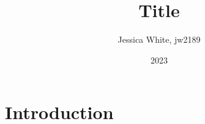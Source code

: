 \documentclass[12pt]{extarticle}
\title{Title}
\author{Jessica White, jw2189}
\date{2023}
\begin{document}
\maketitle


\section{Introduction}
\end{document}
